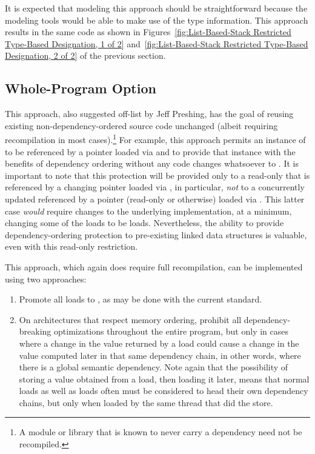 \documentclass[letterpaper,twocolumn,10pt]{article}
\begin{document}
It is expected that modeling this approach should be straightforward
because the modeling tools would be able to make use of the type
information.
This approach results in the same code as shown in
Figures~\ref{fig:List-Based-Stack Restricted Type-Based Designation, 1 of 2}
and~\ref{fig:List-Based-Stack Restricted Type-Based Designation, 2 of 2}
of the previous section.

\subsection{Whole-Program Option}
\label{sec:Whole-Program Option}

This approach, also suggested off-list by Jeff Preshing,
has the goal
of reusing existing non-dependency-ordered source code unchanged
(albeit requiring recompilation in most cases).\footnote{
	A module or library that is known to never carry a dependency
	need not be recompiled.}
For example, this approach permits an instance of  to
be referenced by a pointer loaded via  and to provide
that  instance with the benefits of dependency ordering
without any code changes whatsoever to .
It is important to note that this protection will be provided only to
a read-only  that is referenced by a changing
pointer loaded via , in particular, \emph{not} to a
concurrently updated  referenced by a pointer
(read-only or otherwise) loaded via .
This latter case \emph{would} require changes to the underlying
 implementation, at a minimum, changing some of the
loads to be  loads.
Nevertheless, the ability to provide dependency-ordering protection to
pre-existing linked data structures is valuable, even with
this read-only restriction.

This approach, which again does require full recompilation, can be
implemented using two approaches:

\begin{enumerate}
\item	Promote all  loads to
	, as may be done with the current standard.
\item	On architectures that respect memory ordering, prohibit all
	dependency-breaking optimizations throughout
	the entire program, but only in cases where a change in the value
	returned by a  load could cause a change in
	the value computed later in that same dependency chain, in other
	words, where there is a global semantic dependency.
	Note again that the possibility of storing a value obtained from
	a  load, then loading it later, means
	that normal loads as well as  loads
	often must be considered to head their own dependency chains,
	but only when loaded by the same thread that did the store.
\end{enumerate}
\end{document}
